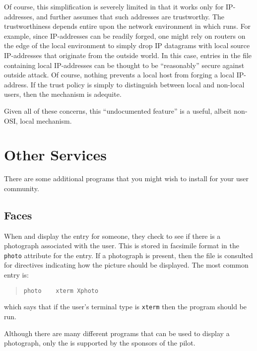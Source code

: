 Of course,
this simplification is severely limited in that it works only for
IP-addresses, and further assumes that such addresses are trustworthy.
The trustworthiness depends entire upon the network environment in which
 runs.
For example,
since IP-addresses can be readily forged,
one might rely on routers on the edge of the local environment to simply drop
IP datagrams with local source IP-addresses that originate from the outside
world.
In this case,
entries in the  file containing local IP-addresses can be
thought to be ``reasonably'' secure against outside attack.
Of course,
nothing prevents a local host from forging a local IP-address.
If the trust policy is simply to distinguish between local and non-local
users,
then the  mechanism is adequite.

Given all of these concerns,
this ``undocumented feature'' is a useful, albeit non-OSI, local mechanism.

\section	{Other Services}
There are some additional programs that you might wish to install for your
user community.

\subsection	{Faces}
When  and  display the entry for someone,
they check to see if there is a photograph associated with the user.
This is stored in facsimile format in the \verb"photo" attribute for the entry.
If a photograph is present,
then the  file is consulted for directives
indicating how the picture should be displayed.
The most common entry is:
\begin{quote}\small\begin{verbatim}
photo    xterm Xphoto
\end{verbatim}\end{quote}
which says that if the user's terminal type is \verb"xterm" then the program
 should be run.

Although there are many different programs that can be used to display a
photograph,
only the  is supported by the sponsors of the pilot.

